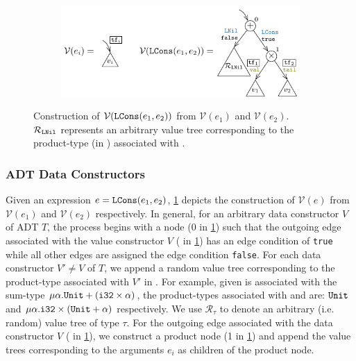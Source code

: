 \begin{figure}[H]
\begin{subfigure}[b]{\textwidth}
\begin{center}
\includegraphics[scale=1.3]{chapters/figures/figValueTreeConvCons.pdf}
\end{center}
\end{subfigure}
\caption{\label{fig:valuetreeconvcons} Construction of $\mathcal{V}({\tt LCons}(e_1,e_2))$ from $\mathcal{V}(e_1)$ and $\mathcal{V}(e_2)$.\\
$\mathcal{R}_{\tt LNil}$ represents an arbitrary value tree corresponding to the product-type (in \typegrammar{}) associated with .}
\end{figure}

\subsubsection{ADT Data Constructors}
Given an expression $e = {\tt LCons}(e_1, e_2)$,
\cref{fig:valuetreeconvcons} depicts the construction of $\mathcal{V}(e)$
from $\mathcal{V}(e_1)$ and $\mathcal{V}(e_2)$ respectively.
In general, for an arbitrary data constructor $V$ of ADT $T$,
the process begins with a \sumn{} node (0 in \cref{fig:valuetreeconvcons})
such that the outgoing edge associated with the value constructor $V$ ( in \cref{fig:valuetreeconvcons})
has an edge condition of {\tt true} while all other edges are assigned the edge condition {\tt false}.
For each data constructor $V' \neq V$ of $T$, we append a random value tree corresponding to the product-type
associated with $V'$ in \typegrammar{}.
For example, given  is associated with the sum-type $\mu \alpha. {\tt Unit} + ({\tt i32} \times \alpha)$,
the product-types associated with  and  are:
${\tt Unit}$ and $\mu \alpha. {\tt i32} \times ({\tt Unit} + \alpha)$ respectively.
We use $\mathcal{R}_\tau$ to denote an arbitrary (i.e. random) value tree of type $\tau$.
For the outgoing edge associated with the data constructor $V$ ( in \cref{fig:valuetreeconvcons}),
we construct a product node (1 in \cref{fig:valuetreeconvcons}) and append the
value trees corresponding to the arguments $e_i$ as children of the product node.

